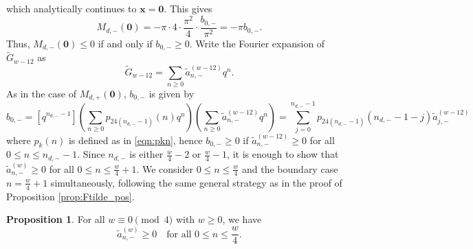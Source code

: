 \documentclass[10pt,reqno]{amsproc}
\newcommand{\1}{\mathds{1}}	%
\theoremstyle{definition}
\newtheorem{proposition}[theorem]{Proposition}
\theoremstyle{remark}
\begin{document}
which analytically continues to $\mathbf{x} = \mathbf{0}$.
This gives
\begin{equation}
    \label{eqn:Mdnegzero}
    M_{d,-}(\mathbf{0}) = -\pi \cdot 4 \cdot \frac{\pi^2}{4} \cdot \frac{b_{0,-}}{\pi^2} = -\pi b_{0,-}.
\end{equation}
Thus, $M_{d,-}(\mathbf{0}) \le 0$ if and only if $b_{0,-} \ge 0$.
Write the Fourier expansion of $\widetilde{G}_{w-12}$ as
\begin{equation}
\widetilde{G}_{w-12} = \sum_{n \ge 0} \tilde{a}_{n,-}^{(w-12)} q^n.
\end{equation}
As in the case of $M_{d,+}(\mathbf{0})$, $b_{0, -}$ is given by
\begin{equation}
    \label{eqn:bzero_neg}
    b_{0,-} = [q^{n_{d,-} - 1}] \left(\sum_{n \ge 0} p_{24(n_{d,-} - 1)}(n) q^n\right) \left(\sum_{n \ge 0} \tilde{a}_{n,-}^{(w-12)} q^n\right) = \sum_{j=0}^{n_{d,-} - 1} p_{24(n_{d,-} - 1)}(n_{d,-} - 1 - j) \tilde{a}_{j,-}^{(w-12)}
\end{equation}
where $p_k(n)$ is defined as in \eqref{eqn:pkn}, hence $b_{0,-} \ge 0$ if $\tilde{a}_{n,-}^{(w-12)} \ge 0$ for all $0 \le n \le n_{d,-} - 1$.
Since $n_{d,-}$ is either $\frac{w}{4} - 2$ or $\frac{w}{4} - 1$, it is enough to show that $\tilde{a}_{n,-}^{(w)} \ge 0$ for all $0 \le n \le \frac{w}{4} + 1$.
We consider $0 \le n \le \frac{w}{4}$ and the boundary case $n = \frac{w}{4} + 1$ simultaneously, following the same general strategy as in the proof of Proposition \ref{prop:Ftilde_pos}.

\begin{proposition}
    \label{prop:Gtilde_pos}
    For all $w \equiv 0 \pmod{4}$ with $w \ge 0$, we have 
    \begin{equation}
        \tilde{a}_{n,-}^{(w)} \ge 0 \quad \text{for all } 0 \le n \le \frac{w}{4}.
    \end{equation}
\end{proposition}
\end{document}
